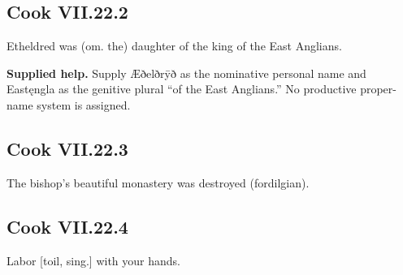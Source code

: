 \par\begin{minipage}{\linewidth}\raggedright
\subsection*{Cook VII.22.2}

Etheldred was (om. the) daughter of the king of the East Anglians.

\end{minipage}\par\addvspace{4pt}

\textbf{Supplied help.} Supply Æðelðrȳð as the nominative personal name and Eastęngla as the genitive plural “of the East Anglians.” No productive proper-name system is assigned.

\par\begin{minipage}{\linewidth}\raggedright
\subsection*{Cook VII.22.3}

The bishop’s beautiful monastery was destroyed (fordilgian).

\end{minipage}\par\addvspace{4pt}

\par\begin{minipage}{\linewidth}\raggedright
\subsection*{Cook VII.22.4}

Labor [toil, sing.] with your hands.

\end{minipage}\par\addvspace{4pt}

